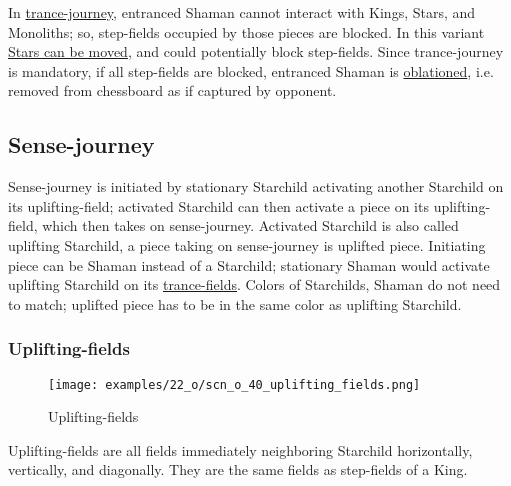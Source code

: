 \vspace*{-0.5\baselineskip}
In \hyperref[fig:scn_cot_52_light_shaman_trance_journey]{trance-journey}, entranced
Shaman cannot interact with Kings, Stars, and Monoliths; so, step-fields occupied by
those pieces are blocked. In this variant
\hyperref[fig:scn_o_09_starchild_moving_star_init]{Stars can be moved}, and could
potentially block step-fields. Since trance-journey is mandatory, if all step-fields
are blocked, entranced Shaman is \hyperref[sec:Terms/Oblation]{oblationed}, i.e.
removed from chessboard as if captured by opponent.

\clearpage %

\subsection*{Sense-journey}
\label{sec:One/Starchild/Sense-journey}

\vspace*{-0.7\baselineskip}
Sense-journey is initiated by stationary Starchild activating another Starchild
on its uplifting-field; activated Starchild can then activate a piece on its
uplifting-field, which then takes on sense-journey. Activated Starchild is also
called uplifting Starchild, a piece taking on sense-journey is uplifted piece.
Initiating piece can be Shaman instead of a Starchild; stationary Shaman would
activate uplifting Starchild on its
\hyperref[fig:scn_cot_40_trance_fields]{trance-fields}. Colors of Starchilds,
Shaman do not need to match; uplifted piece has to be in the same color as
uplifting Starchild.

\vspace*{-0.9\baselineskip}
\subsubsection*{Uplifting-fields}
\label{sec:One/Starchild/Sense-journey/Uplifting-fields}

\vspace*{-0.9\baselineskip}
\noindent
\begin{wrapfigure}[5]{l}{0.4\textwidth}
\centering
\texttt{[image: examples/22\_o/scn\_o\_40\_uplifting\_fields.png]}
\vspace*{-0.4\baselineskip}
\caption{Uplifting-fields}
\label{fig:scn_o_40_uplifting_fields}
\end{wrapfigure}
Uplifting-fields are all fields immediately neighboring Starchild horizontally,
vertically, and diagonally. They are the same fields as step-fields of a King.

